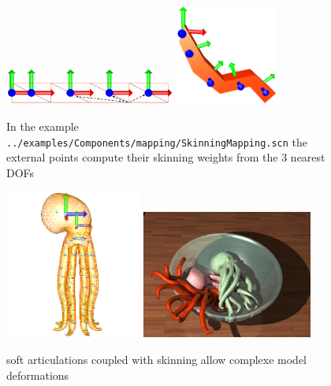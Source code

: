 \begin{figure}[htpb]
		\centering
		\includegraphics[width=0.50\textwidth]{articulatedbodies/skinning}
		\includegraphics[width=0.30\textwidth]{articulatedbodies/skinnedPendulum}	
	\caption{In the example \texttt{../examples/Components/mapping/SkinningMapping.scn} the external points compute their skinning weights from the 3 nearest DOFs}
\end{figure}

\begin{figure}[htpb]
		\centering
		\includegraphics[width=0.40\textwidth]{articulatedbodies/teodule_wireframe}	
		\includegraphics[width=0.50\textwidth]{articulatedbodies/teodule_soupedepoulpe}	
	\caption{soft articulations coupled with skinning allow complexe model deformations}
\end{figure}
